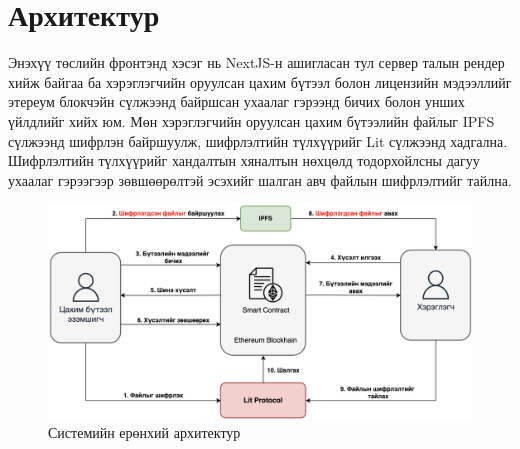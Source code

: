 \newpage
\section{Архитектур}
Энэхүү төслийн фронтэнд хэсэг нь NextJS-н ашигласан тул сервер талын рендер хийж байгаа ба хэрэглэгчийн оруулсан цахим бүтээл болон лицензийн мэдээллийг этереум блокчэйн сүлжээнд байршсан ухаалаг гэрээнд бичих болон унших үйлдлийг хийх юм. Мөн хэрэглэгчийн оруулсан цахим бүтээлийн файлыг IPFS сүлжээнд шифрлэн байршуулж, шифрлэлтийн түлхүүрийг Lit сүлжээнд хадгална. Шифрлэлтийн түлхүүрийг хандалтын хяналтын нөхцөлд тодорхойлсны дагуу ухаалаг гэрээгээр зөвшөөрөлтэй эсэхийг шалган авч файлын шифрлэлтийг тайлна. \\

\begin{figure}[h!]
	\centering
	\includegraphics[scale=0.26]{src/images/architecture.png}
	\caption{Системийн ерөнхий архитектур}
\end{figure}
